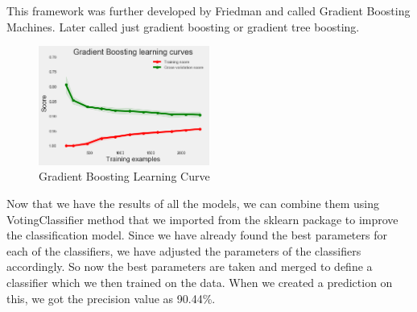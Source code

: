 This framework was further developed by Friedman and called Gradient Boosting Machines. Later called just gradient boosting or gradient tree boosting.

\begin{figure}[h]
\caption{Gradient Boosting Learning Curve}
\label{5.3}
\centering
\includegraphics[width=0.5\textwidth]{images/5_4.png}
\end{figure}

Now that we have the results of all the models, we can combine them using VotingClassifier method that we imported from the sklearn package to improve the classification model. Since we have already found the best parameters for each of the classifiers, we have adjusted the parameters of the classifiers accordingly. So now the best parameters are taken and merged to define a classifier which  we then trained on the data. When we created a prediction on this, we got the precision value as 90.44\%.

